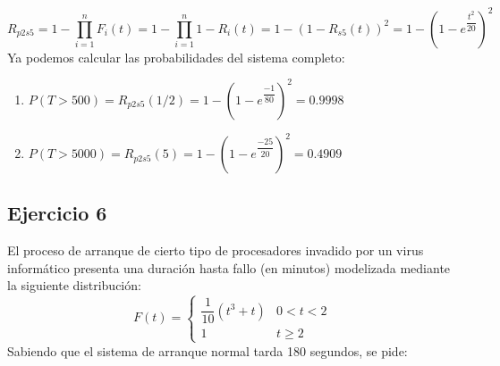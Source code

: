\begin{enumerate}
\begin{tcolorbox}[colback=white,colframe=cyan!50!black,fonttitle=\bfseries]
        \[R_{p2s5}=1-\prod_{i=1}^{n}F_i(t)=1-\prod_{i=1}^{n}1-R_i(t)=1-(1-R_{s5}(t))^2=1-(1-e^{\dfrac{t^2}{20}})^2
        \]
        Ya podemos calcular las probabilidades del sistema completo:
        \begin{enumerate}
            \item $P(T>500)=R_{p2s5}(1/2)=1-(1-e^{\dfrac{-1}{80}})^2=0.9998$
            \item $P(T>5000)=R_{p2s5}(5)=1-(1-e^{\dfrac{-25}{20}})^2=0.4909$
        \end{enumerate}
    \end{tcolorbox}
\end{enumerate}
\subsection{Ejercicio 6}
El  proceso  de  arranque  de  cierto  tipo  de  procesadores  invadido  por un  virus  informático  presenta  una duración hasta fallo (en minutos) modelizada mediante la siguiente distribución:
\[ F(t)=\begin{cases} 
      \dfrac{1}{10}(t^3+t) & 0<t<2 \\
      1 & t\geq 2 
   \end{cases}
\]
Sabiendo que el sistema de arranque normal tarda 180 segundos, se pide:
